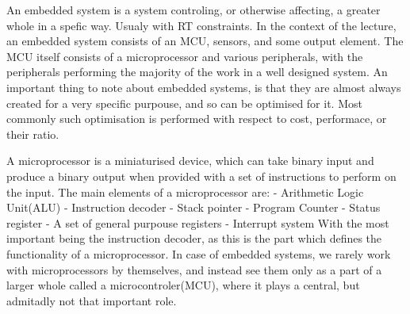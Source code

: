 


\sol An embedded system is a system controling, or otherwise affecting, a greater whole in a spefic way.
    Usualy with RT constraints. In the context of the lecture, an embedded system consists of an MCU,
    sensors, and some output element. The MCU itself consists of a microprocessor and various peripherals,
    with the peripherals performing the majority of the work in a well designed system. An important thing
    to note about embedded systems, is that they are almost always created for a very specific purpouse, 
    and so can be optimised for it. Most commonly such optimisation is performed with respect to cost,
    performace, or their ratio.

 \sol A microprocessor is a miniaturised device, which can take binary input and produce a binary output when
    provided with a set of instructions to perform on the input. The main elements of a microprocessor are: \newline
    - Arithmetic Logic Unit(ALU) \newline
    - Instruction decoder \newline
    - Stack pointer \newline
    - Program Counter \newline
    - Status register \newline
    - A set of general purpouse registers \newline
    - Interrupt system \newline
    With the most important being the instruction decoder, as this is the part which defines the functionality
    of a microprocessor. In case of embedded systems, we rarely work with microprocessors by themselves, and
    instead see them only as a part of a larger whole called a microcontroler(MCU), where it plays a central,
    but admitadly not that important role.

